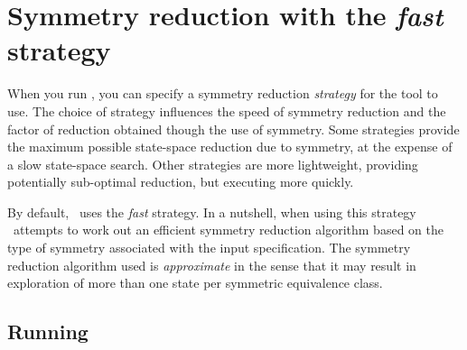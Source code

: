 \section{Symmetry reduction with the \emph{fast} strategy}\label{sec:example:fast}

When you run \topspin, you can specify a symmetry reduction
\emph{strategy} for the tool to use.  The choice of strategy
influences the speed of symmetry reduction and the factor of
reduction obtained though the use of symmetry.  Some strategies
provide the maximum possible state-space reduction due to symmetry,
at the expense of a slow state-space search.  Other strategies are
more lightweight, providing potentially sub-optimal reduction, but
executing more quickly.

By default, \topspin\ uses the \emph{fast} strategy.  In a nutshell,
when using this strategy \topspin\ attempts to work out an efficient
symmetry reduction algorithm based on the type of symmetry
associated with the input specification.  The symmetry reduction
algorithm used is \emph{approximate} in the sense that it may result
in exploration of more than one state per symmetric equivalence
class.

\subsection{Running \protect\topspin}

